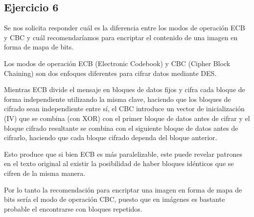 \documentclass[11pt]{article}
\begin{document}
\subsection*{Ejercicio 6}

Se nos solicita responder cuál es la diferencia entre los modos de operación ECB y CBC y 
cuál recomendaríamos para
encriptar el contenido de una imagen en forma de mapa de bits. 

Los modos de operación ECB (Electronic Codebook) y CBC (Cipher Block Chaining) son dos enfoques 
diferentes para cifrar datos mediante DES.

Mientras ECB divide el mensaje en bloques de datos fijos y cifra cada bloque de forma independiente utilizando la misma clave, 
haciendo que los bloques de cifrado sean independiente entre sí, el CBC 
introduce un vector de inicialización (IV) que se combina (con XOR) con el primer bloque de datos antes de cifrar y
el bloque cifrado resultante se combina con el siguiente bloque de datos antes de cifrarlo, haciendo que 
cada bloque cifrado dependa del bloque anterior.

Esto produce que si bien ECB es más paralelizable, este puede revelar patrones en el texto original 
al existir la posibilidad de haber bloques idénticos que se cifren de la misma manera. 

Por lo tanto la recomendación para encriptar una imagen en forma de mapa de bits sería el modo de 
operación CBC, puesto que en imágenes es bastante probable el encontrarse con bloques repetidos.
\end{document}

